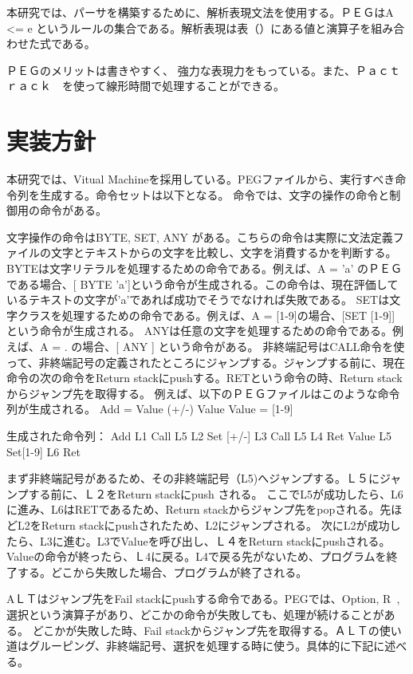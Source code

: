 \documentclass[12pt,oneside]{report}
\begin{document}
本研究では、パーサを構築するために、解析表現文法を使用する。ＰＥＧはA <= e というルールの集合である。解析表現は表（）にある値と演算子を組み合わせた式である。

ＰＥＧのメリットは書きやすく、
強力な表現力をもっている。また、Ｐａｃｔｒａｃｋ　を使って線形時間で処理することができる。


\chapter{実装方針}
本研究では、Vitual Machineを採用している。PEGファイルから、実行すべき命令列を生成する。命令セットは以下となる。
命令では、文字の操作の命令と制御用の命令がある。

文字操作の命令はBYTE, SET, ANY がある。こちらの命令は実際に文法定義ファイルの文字とテキストからの文字を比較し、文字を消費するかを判断する。
BYTEは文字リテラルを処理するための命令である。例えば、A =  'a' のＰＥＧである場合、[ BYTE 'a']という命令が生成される。この命令は、現在評価しているテキストの文字が'a'であれば成功でそうでなければ失敗である。
SETは文字クラスを処理するための命令である。例えば、A = [1-9]の場合、[SET [1-9]] という命令が生成される。
ANYは任意の文字を処理するための命令である。例えば、A = . の場合、[ ANY ] という命令がある。
非終端記号はCALL命令を使って、非終端記号の定義されたところにジャンプする。ジャンプする前に、現在命令の次の命令をReturn stackにpushする。RETという命令の時、Return stackからジャンプ先を取得する。
例えば、以下のＰＥＧファイルはこのような命令列が生成される。
Add = Value (+/-) Value
Value = [1-9]

生成された命令列：
Add L1 Call L5
      L2 Set [+/-]
      L3 Call L5
      L4 Ret
Value L5 Set[1-9]
        L6 Ret

まず非終端記号があるため、その非終端記号（L5)へジャンプする。Ｌ５にジャンプする前に、Ｌ２をReturn stackにpush される。
ここでL5が成功したら、L6に進み、L6はRETであるため、Return stackからジャンプ先をpopされる。先ほどL2をReturn stackにpushされたため、L2にジャンプされる。
次にL2が成功したら、L3に進む。L3でValueを呼び出し、Ｌ４をReturn stackにpushされる。
Valueの命令が終ったら、Ｌ4に戻る。L4で戻る先がないため、プログラムを終了する。どこから失敗した場合、プログラムが終了される。


AＬＴはジャンプ先をFail stackにpushする命令である。PEGでは、Option, R~, 選択という演算子があり、どこかの命令が失敗しても、処理が続けることがある。
どこかが失敗した時、Fail stackからジャンプ先を取得する。ＡＬＴの使い道はグルーピング、非終端記号、選択を処理する時に使う。具体的に下記に述べる。
\end{document}
